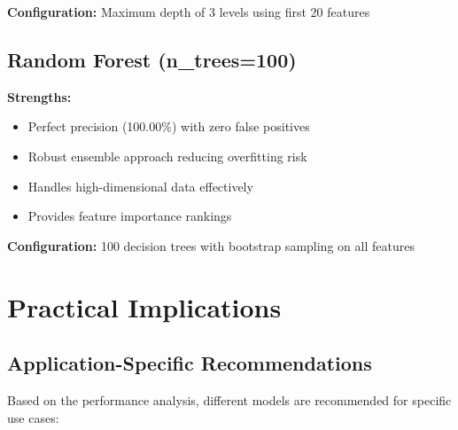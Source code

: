 \textbf{Configuration:} Maximum depth of 3 levels using first 20 features

\subsection{Random Forest (n\_trees=100)}

\textbf{Strengths:}
\begin{itemize}
    \item Perfect precision (100.00\%) with zero false positives
    \item Robust ensemble approach reducing overfitting risk
    \item Handles high-dimensional data effectively
    \item Provides feature importance rankings
\end{itemize}

\textbf{Configuration:} 100 decision trees with bootstrap sampling on all features

\section{Practical Implications}

\subsection{Application-Specific Recommendations}

Based on the performance analysis, different models are recommended for specific use cases:

